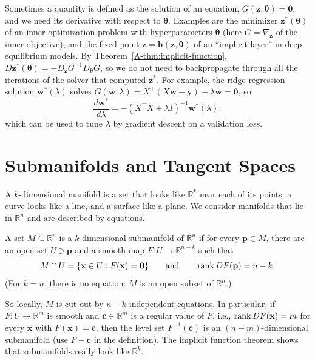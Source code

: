 \begin{remark}\label{A-rem:implicit-ml}
    Sometimes a quantity is defined as the solution of an equation, $G(\mathbf{z}, \boldsymbol{\theta}) = \mathbf{0}$, and we need its derivative with respect to $\boldsymbol{\theta}$. Examples are the minimizer $\mathbf{z}^*(\boldsymbol{\theta})$ of an inner optimization problem with hyperparameters $\boldsymbol{\theta}$ (here $G = \nabla_{\mathbf{z}}$ of the inner objective), and the fixed point $\mathbf{z} = \mathbf{h}(\mathbf{z}, \boldsymbol{\theta})$ of an ``implicit layer'' in deep equilibrium models. By Theorem~\ref{A-thm:implicit-function}, $D\mathbf{z}^*(\boldsymbol{\theta}) = -D_{\mathbf{z}}G^{-1}D_{\boldsymbol{\theta}}G$, so we do not need to backpropagate through all the iterations of the solver that computed $\mathbf{z}^*$. For example, the ridge regression solution $\mathbf{w}^*(\lambda)$ solves $G(\mathbf{w}, \lambda) = X^\top(X\mathbf{w} - \mathbf{y}) + \lambda\mathbf{w} = \mathbf{0}$, so
    \[\frac{d\mathbf{w}^*}{d\lambda} = -(X^\top X + \lambda I)^{-1}\mathbf{w}^*(\lambda),\]
    which can be used to tune $\lambda$ by gradient descent on a validation loss.
\end{remark}

\section{Submanifolds and Tangent Spaces}\label{A-sec:manifolds}

A $k$-dimensional manifold is a set that looks like $\mathbb{R}^k$ near each of its points: a curve looks like a line, and a surface like a plane. We consider manifolds that lie in $\mathbb{R}^n$ and are described by equations.

\begin{definition}[Submanifold]\label{A-def:submanifold}
    A set $M \subseteq \mathbb{R}^n$ is a $k$-dimensional submanifold of $\mathbb{R}^n$ if for every $\mathbf{p} \in M$, there are an open set $U \ni \mathbf{p}$ and a smooth map $F: U \to \mathbb{R}^{n-k}$ such that
    \[M \cap U = \{\mathbf{x} \in U : F(\mathbf{x}) = \mathbf{0}\} \qquad \text{and} \qquad \operatorname{rank} DF(\mathbf{p}) = n - k.\]
    (For $k = n$, there is no equation: $M$ is an open subset of $\mathbb{R}^n$.)
\end{definition}

So locally, $M$ is cut out by $n - k$ independent equations. In particular, if $F: U \to \mathbb{R}^m$ is smooth and $\mathbf{c} \in \mathbb{R}^m$ is a regular value of $F$, i.e., $\operatorname{rank} DF(\mathbf{x}) = m$ for every $\mathbf{x}$ with $F(\mathbf{x}) = \mathbf{c}$, then the level set $F^{-1}(\mathbf{c})$ is an $(n - m)$-dimensional submanifold (use $F - \mathbf{c}$ in the definition). The implicit function theorem shows that submanifolds really look like $\mathbb{R}^k$.


